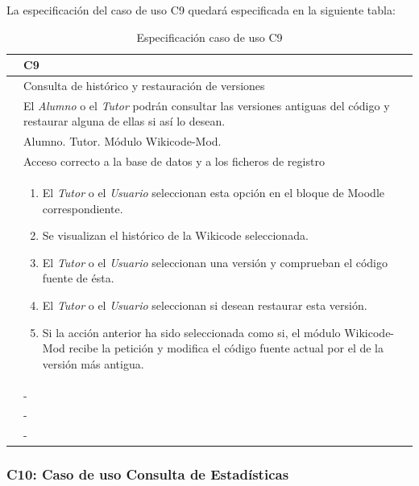 La especificación del caso de uso C9 quedará especificada en la siguiente tabla:

\begin{table}[h]
\centering
\begin{tabular}{ | p{} | p{} | }
	\hline
	\cellcolor[gray]{.8}{ID} & C9 \\
	\hline 
	\cellcolor[gray]{.8}{Nombre} & Consulta de histórico y restauración de versiones \\
	\hline
	\cellcolor[gray]{.8}{Descripción} & El \emph{Alumno} o el \emph{Tutor} podrán consultar las versiones antiguas del código y restaurar alguna de ellas si así lo desean. \\
	\hline
	\cellcolor[gray]{.8}{Actores} & Alumno. Tutor. Módulo Wikicode-Mod. \\
	\hline
	\cellcolor[gray]{.8}{Asunciones} & Acceso correcto a la base de datos y a los ficheros de registro \\
	\hline
	\cellcolor[gray]{.8}{Pasos} & \begin{enumerate}
		\item El \emph{Tutor} o el \emph{Usuario} seleccionan esta opción en el bloque de Moodle correspondiente. 
		\item Se visualizan el histórico de la Wikicode seleccionada.
		\item El \emph{Tutor} o el \emph{Usuario} seleccionan una versión y comprueban el código fuente de ésta.
		\item El \emph{Tutor} o el \emph{Usuario} seleccionan si desean restaurar esta versión.
		\item Si la acción anterior ha sido seleccionada como si, el módulo Wikicode-Mod recibe la petición y modifica el código fuente actual por el de la versión más antigua.
		\end{enumerate} \\
	\hline
	\cellcolor[gray]{.8}{Variaciones} & - \\
	\hline
	\cellcolor[gray]{.8}{Requisitos no funcionales} & - \\
	\hline
	\cellcolor[gray]{.8}{Cuestiones} & - \\
	\hline
	
\end{tabular}
\caption{Especificación caso de uso C9}
\end{table}

\newpage
\subsubsection{C10: Caso de uso Consulta de Estadísticas}

